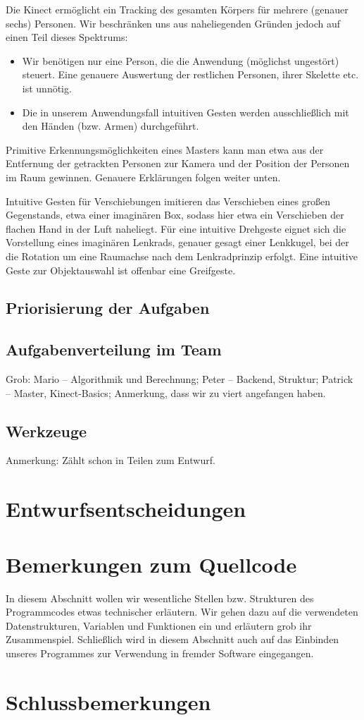 \documentclass[12pt,a4paper]{article}
\begin{document}
	Die Kinect ermöglicht ein Tracking des gesamten Körpers für mehrere (genauer sechs) Personen. Wir beschränken uns aus naheliegenden Gründen jedoch auf einen Teil dieses Spektrums:
	\begin{itemize}
		\item Wir benötigen nur eine Person, die die Anwendung (möglichst ungestört) steuert. Eine genauere Auswertung der restlichen Personen, ihrer Skelette etc. ist unnötig.
		\item Die in unserem Anwendungsfall intuitiven Gesten werden ausschließlich mit den Händen (bzw. Armen) durchgeführt.
	\end{itemize}
	Primitive Erkennungsmöglichkeiten eines Masters kann man etwa aus der Entfernung der getrackten Personen zur Kamera und der Position der Personen im Raum gewinnen. Genauere Erklärungen folgen weiter unten.\par 
	Intuitive Gesten für Verschiebungen imitieren das Verschieben eines großen Gegenstands, etwa einer imaginären Box, sodass hier etwa ein Verschieben der flachen Hand in der Luft naheliegt. Für eine intuitive Drehgeste eignet sich die Vorstellung eines imaginären Lenkrads, genauer gesagt einer Lenkkugel, bei der die Rotation um eine Raumachse nach dem Lenkradprinzip erfolgt. Eine intuitive Geste zur Objektauswahl ist offenbar eine Greifgeste.
	\subsection{Priorisierung der Aufgaben}
	\subsection{Aufgabenverteilung im Team}
	Grob:
		Mario -- Algorithmik und Berechnung;
		Peter -- Backend, Struktur;
		Patrick -- Master, Kinect-Basics;
	Anmerkung, dass wir zu viert angefangen haben.
	\subsection{Werkzeuge}
	Anmerkung: Zählt schon in Teilen zum Entwurf.
\clearpage
\section{Entwurfsentscheidungen}
	
	
	
	
%
%
\clearpage
\section{Bemerkungen zum Quellcode}
In diesem Abschnitt wollen wir wesentliche Stellen bzw. Strukturen des Programmcodes etwas technischer erläutern. Wir gehen dazu auf die verwendeten Datenstrukturen, Variablen und Funktionen ein und erläutern grob ihr Zusammenspiel. Schließlich wird in diesem Abschnitt auch auf das Einbinden unseres Programmes zur Verwendung in fremder Software eingegangen.
	
	
	
%
%
\section{Schlussbemerkungen}

\newpage
\printbibliography
\end{document}
